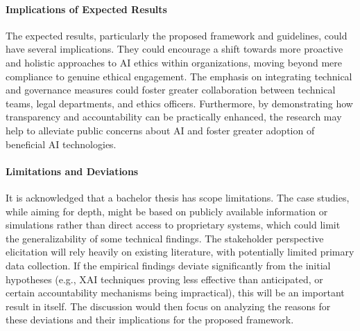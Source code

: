 \documentclass[english]{hogent-article}
\begin{document}
\paragraph{Implications of Expected Results}
The expected results, particularly the proposed framework and guidelines, could have several implications. They could encourage a shift towards more proactive and holistic approaches to AI ethics within organizations,
moving beyond mere compliance to genuine ethical engagement. The emphasis on integrating technical and governance measures could foster greater collaboration between technical teams, legal departments, and ethics officers. Furthermore, by demonstrating how transparency and accountability can be practically enhanced, the research may help to alleviate public concerns about AI and foster greater adoption of beneficial AI technologies.

\paragraph{Limitations and Deviations}
It is acknowledged that a bachelor thesis has scope limitations. The case studies, while aiming for depth, might be based on publicly available information or simulations rather than direct access to proprietary systems, which could limit the generalizability of some technical findings. The stakeholder perspective elicitation will rely heavily on existing literature, with potentially limited primary data collection. If the empirical findings deviate significantly from the initial hypotheses (e.g., XAI techniques proving less effective than anticipated, or certain accountability mechanisms being impractical), this will be an important result in itself. The discussion would then focus on analyzing the reasons for these deviations and their implications for the proposed framework.
\end{document}
